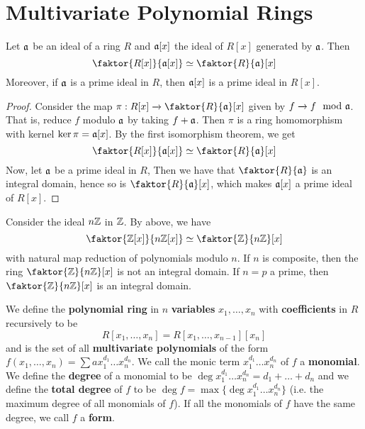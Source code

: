 \section{Multivariate Polynomial Rings}
\label{section_7.1}

\begin{theorem}\label{theorem_7.1.1}
  Let $\mathfrak{a}$ be an ideal of a ring $R$ and $\mathfrak{a}[x]$ the ideal of $R[x]$ generated by
  $\mathfrak{a}$. Then
  \begin{equation*}
    \faktor{R[x]}{\af[x]} \simeq \faktor{R}{\af}[x]
  \end{equation*}
  Moreover, if $\mathfrak{a}$ is a prime ideal in $R$, then $\mathfrak{a}[x]$ is a prime ideal in
  $R[x]$.
\end{theorem}
\begin{proof}
  Consider the map $\pi:R[x] \xrightarrow{} \faktor{R}{\af}[x]$ given by $f
  \xrightarrow{} f \mod{\mathfrak{a}}$. That is, reduce $f$ modulo $\mathfrak{a}$ by
  taking $f+\mathfrak{a}$. Then $\pi$ is a ring homomorphism with kernel
  $\ker{\pi}=\mathfrak{a}[x]$. By the first isomorphism theorem, we get
  \begin{equation*}
    \faktor{R[x]}{\af[x]} \simeq \faktor{R}{\af}[x]
  \end{equation*}
  Now, let $\mathfrak{a}$ be a prime ideal in $R$, Then we have that
  $\faktor{R}{\af}$ is an integral domain, hence so is $\faktor{R}{\af}[x]$,
  which makes $\mathfrak{a}[x]$ a prime ideal of $R[x]$.
\end{proof}

\begin{example}\label{example_7.1}
  Consider the ideal $n\mathbb{Z}$ in  $\mathbb{Z}$. By above, we have
  \begin{equation*}
    \faktor{\Z[x]}{n\Z[x]} \simeq \faktor{\Z}{n\Z}[x]
  \end{equation*}
  with natural map reduction of polynomials modulo $n$. If $n$ is composite,
  then the ring $\faktor{\Z}{n\Z}[x]$ is not an integral domain. If $n=p$ a
  prime, then  $\faktor{\Z}{n\Z}[x]$ is an integral domain.
\end{example}

\begin{definition}
  We define the \textbf{polynomial ring} in $n$  \textbf{variables} $x_1,
  \dots, x_n$ with \textbf{coefficients} in $R$ recursively to be
  \begin{equation*}
    R[x_1, \dots, x_n]=R[x_1, \dots, x_{n-1}][x_n]
  \end{equation*}
  and is the set of all \textbf{multivariate polynomials} of the form $f(x_1,
  \dots,x_n)=\sum{ax_1^{d_1} \dots x_n^{d_n}}$. We call the monic term
  $x_1^{d_1} \dots x_n^{d_n}$ of $f$ a  \textbf{monomial}. We define the
  \textbf{degree} of a monomial to be $\deg{x_1^{d_1} \dots
  x_n^{d_n}}=d_1+\dots+d_n$ and we define the \textbf{total degree}
  of $f$ to be $\deg{f}=\max{\{\deg{x_1^{d_1} \dots x_n^{d_n}}\}}$
  (i.e. the maximum degree of all monomials of $f$). If all the
  monomials of $f$ have the same degree, we call  $f$ a \textbf{form}.
\end{definition}

